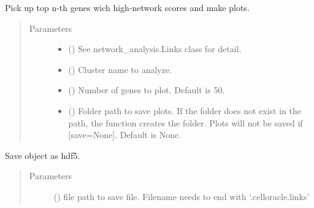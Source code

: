 \documentclass[letterpaper,10pt,english]{sphinxmanual}
\begin{document}
\begin{fulllineitems}
\begin{fulllineitems}
\label{\detokenize{modules/celloracle:celloracle.Links.plot_scores_as_rank}}
Pick up top n-th genes wich high-network scores and make plots.
\begin{quote}\begin{description}
\item[{Parameters}] \leavevmode\begin{itemize}
\item {} 
 ({\hyperref[\detokenize{modules/celloracle:celloracle.Links}]{}}) \textendash{} See network\_analysis.Links class for detail.

\item {} 
 () \textendash{} Cluster name to analyze.

\item {} 
 () \textendash{} Number of genes to plot. Default is 50.

\item {} 
 () \textendash{} Folder path to save plots. If the folder does not exist in the path, the function creates the folder.
Plots will not be saved if {[}save=None{]}. Default is None.

\end{itemize}

\end{description}\end{quote}

\end{fulllineitems}


\begin{fulllineitems}
\label{\detokenize{modules/celloracle:celloracle.Links.to_hdf5}}
Save object as hdf5.
\begin{quote}\begin{description}
\item[{Parameters}] \leavevmode
{} () \textendash{} file path to save file. Filename needs to end with ‘.celloracle.links’

\end{description}\end{quote}

\end{fulllineitems}


\end{fulllineitems}
\end{document}
